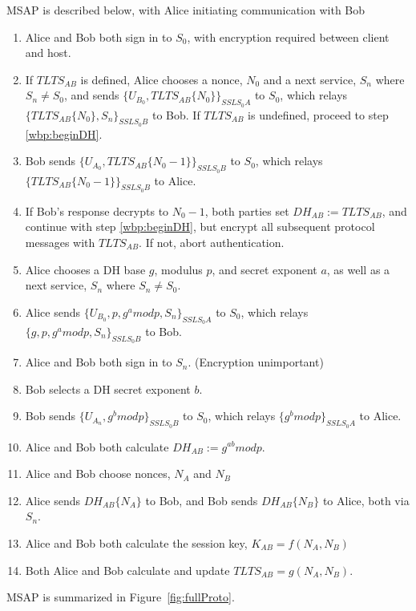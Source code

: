 \documentclass[twoside,10pt]{article}
\begin{document}
\begin{multicols}{2}
MSAP is described below, with Alice initiating communication with Bob
\begin{enumerate}
\item Alice and Bob both sign in to $S_0$, with encryption required between client and host.
\item If $TLTS_{AB}$ is defined, Alice chooses a nonce, $N_0$ and a next service, $S_n$ where $S_n \neq S_0$, and sends $\{U_{B_0}, TLTS_{AB}\{N_0\}\}_{SSL S_0 A}$ to $S_0$, which relays $\{TLTS_{AB}\{N_0\}, S_n\}_{SSL S_0 B}$ to Bob.  If $TLTS_{AB}$ is undefined, proceed to step \ref{wbp:beginDH}.
\item Bob sends $\{U_{A_0}, TLTS_{AB}\{N_0-1\}\}_{SSL S_0 B}$ to $S_0$, which relays $\{TLTS_{AB}\{N_0-1\}\}_{SSL S_0 B}$ to Alice.
\item If Bob's response decrypts to $N_0-1$, both parties set $DH_{AB}:=TLTS_{AB}$, and continue with step \ref{wbp:beginDH}, but encrypt all subsequent protocol messages with $TLTS_{AB}$.  If not, abort authentication.
\item \label{wbp:beginDH} Alice chooses a DH base $g$, modulus $p$, and secret exponent $a$, as well as a next service, $S_n$ where $S_n \neq S_0$.
\item Alice sends $\{U_{B_0}, p, g^a mod p, S_n\}_{SSL S_0 A}$ to $S_0$, which relays $\{g, p, g^a mod p, S_n\}_{SSL S_0 B}$ to Bob.
\item Alice and Bob both sign in to $S_n$.  (Encryption unimportant)
\item Bob selects a DH secret exponent $b$.
\item Bob sends $\{U_{A_n}, g^b mod p\}_{SSL S_0 B}$ to $S_0$, which relays $\{g^b mod p\}_{SSL S_0 A}$ to Alice.
\item Alice and Bob both calculate $DH_{AB}:=g^{ab} mod p$.
\item \label{wbp:beginNonceExchange} Alice and Bob choose nonces, $N_A$ and $N_B$
\item Alice sends $DH_{AB}\{N_A\}$ to Bob, and Bob sends $DH_{AB}\{N_B\}$ to Alice, both via $S_n$.
\item Alice and Bob both calculate the session key, $K_{AB}=f(N_A, N_B)$
\item Both Alice and Bob calculate and update $TLTS_{AB}=g(N_A, N_B)$.
\end{enumerate}

MSAP is summarized in Figure~\ref{fig:fullProto}.



\end{multicols}
\end{document}
